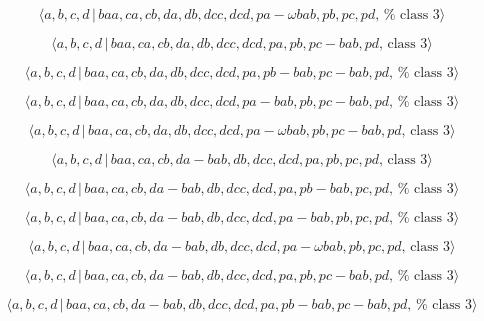 \documentclass[10pt]{article}
\begin{document}
\begin{equation}
\langle a,b,c,d\,|\,baa,ca,cb,da,db,dcc,dcd,pa-\omega bab,pb,pc,pd,\,\text{%
class }3\rangle  \tag{7.4085}
\end{equation}

\begin{equation}
\langle a,b,c,d\,|\,baa,ca,cb,da,db,dcc,dcd,pa,pb,pc-bab,pd,\,\text{class }%
3\rangle  \tag{7.4086}
\end{equation}

\begin{equation}
\langle a,b,c,d\,|\,baa,ca,cb,da,db,dcc,dcd,pa,pb-bab,pc-bab,pd,\,\text{%
class }3\rangle  \tag{7.4087}
\end{equation}

\begin{equation}
\langle a,b,c,d\,|\,baa,ca,cb,da,db,dcc,dcd,pa-bab,pb,pc-bab,pd,\,\text{%
class }3\rangle  \tag{7.4088}
\end{equation}

\begin{equation}
\langle a,b,c,d\,|\,baa,ca,cb,da,db,dcc,dcd,pa-\omega bab,pb,pc-bab,pd,\,%
\text{class }3\rangle  \tag{7.4089}
\end{equation}

\begin{equation}
\langle a,b,c,d\,|\,baa,ca,cb,da-bab,db,dcc,dcd,pa,pb,pc,pd,\,\text{class }%
3\rangle  \tag{7.4090}
\end{equation}

\begin{equation}
\langle a,b,c,d\,|\,baa,ca,cb,da-bab,db,dcc,dcd,pa,pb-bab,pc,pd,\,\text{%
class }3\rangle  \tag{7.4091}
\end{equation}

\begin{equation}
\langle a,b,c,d\,|\,baa,ca,cb,da-bab,db,dcc,dcd,pa-bab,pb,pc,pd,\,\text{%
class }3\rangle  \tag{7.4092}
\end{equation}

\begin{equation}
\langle a,b,c,d\,|\,baa,ca,cb,da-bab,db,dcc,dcd,pa-\omega bab,pb,pc,pd,\,%
\text{class }3\rangle  \tag{7.4093}
\end{equation}

\begin{equation}
\langle a,b,c,d\,|\,baa,ca,cb,da-bab,db,dcc,dcd,pa,pb,pc-bab,pd,\,\text{%
class }3\rangle  \tag{7.4094}
\end{equation}

\begin{equation}
\langle a,b,c,d\,|\,baa,ca,cb,da-bab,db,dcc,dcd,pa,pb-bab,pc-bab,pd,\,\text{%
class }3\rangle  \tag{7.4095}
\end{equation}
\end{document}
